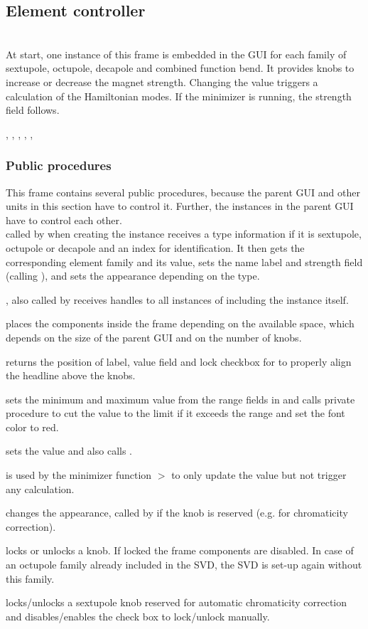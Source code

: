 \documentclass[12pt]{article}
\newcommand\code[1]{{\tt #1}}
\newcommand\guico[1]{{\color{blue}\code{#1}}}
\newcommand\guifco[1]{{\color{violet}\code{#1}}}
\newcommand{\grcod}[2]{\opagui{#1}$>$\guico{#2}}
\newcommand{\opagui}[1]{\colorbox{blue!20}{{\color{black}\code{#1}}}}
\newcommand{\ogui}[1]{\hyperref[#1]{\opagui{#1}}}
\newcommand{\opaguif}[1]{\colorbox{violet!30}{{\color{black}\code{#1}}}}
\newcommand{\oguifh}[2]{\subsection{\label{#2}#1}{\Huge\opaguif{#2}}\\}
\newcommand{\oguif}[1]{\hyperref[#1]{\opaguif{#1}}}
\newcommand{\opauni}[1]{\colorbox{orange!30}{{\color{black}\code{#1}}}}
\newcommand{\ouni}[1]{\hyperref[#1]{\opauni{#1}}}
\newcommand{\uses}[1]{\flushleft {\bf Uses:} #1}
\newcommand{\desc}[1]{#1}
\newcommand{\ppro}[1]{\subsubsection*{Public procedures} #1}
\begin{document}
\oguifh{Element controller}{csexframe} 

\desc{At start, one instance of this frame is embedded in the GUI for each family of sextupole, octupole, decapole and combined function bend. It provides knobs to increase or decrease the magnet strength. Changing the value triggers a calculation of the Hamiltonian modes. If the minimizer is running, the strength field follows.}

\uses{
\ouni{chromreslib}, \ouni{chromelelib}, \ouni{chromlib}, \ogui{ochromsvector},  \ouni{globlib}, \ouni{../com/asaux}
}

\ppro{
This frame contains several public procedures, because the parent GUI \ogui{opachroma} and other units in this section have to control it. Further, the instances in the parent GUI have to control each other.\\

\guifco{Init} called by \ogui{opachroma} when creating the instance receives a type information if it is sextupole, octupole or decapole and an index for identification. It then gets the corresponding element family and its value, sets the name label and strength field (calling \guifco{SetVal}), and sets the appearance depending on the type.

\guifco{Brothers}, also called by \ogui{opachroma} receives handles to all instances of \oguif{csexframe} including the instance itself.

\guifco{SetSize} places the components inside the frame depending on the available space, which depends on the size of the parent GUI and on the number of knobs.

\guifco{getTabs} returns the position of label, value field and lock checkbox for \ogui{opachroma} to properly align the headline above the knobs.

\guifco{SetRange} sets the minimum and maximum value from the range fields in \ogui{opachroma} and calls private procedure \guifco{LimitVal} to cut the value to the limit if it exceeds the range and set the font color to red.

\guifco{SetVal} sets the value and also calls \guifco{LimitVal}.

\guifco{UpdateValbyMin} is used by the minimizer function \grcod{opachroma}{PenaltyFunction} to only update the value but not trigger any calculation.

\guifco{mySetColor} changes the appearance, called by \ogui{opachroma} if the knob is reserved (e.g. for chromaticity correction).

\guifco{Lock,UnLock} locks or unlocks a knob. If locked the frame components are disabled. In case of an octupole family already included in the SVD, the SVD is set-up again without this family.

\guifco{Chrom(Lock,Unlock)} locks/unlocks a sextupole knob reserved for automatic chromaticity correction and disables/enables the check box to lock/unlock manually.
}
\end{document}
